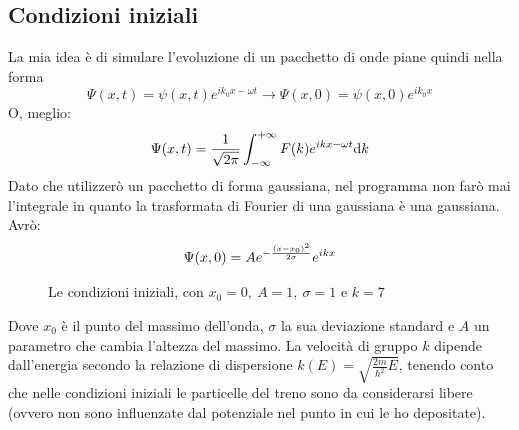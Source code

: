 \subsection{Condizioni iniziali}
La mia idea \`e di simulare l'evoluzione di un pacchetto di onde piane quindi nella forma
\begin{equation}
  \Psi(x,t) = \psi(x,t)e^{ik_0x-\omega t} \to \Psi(x,0) = \psi(x,0)e^{ik_0x}
\end{equation}
O, meglio:
\begin{equation}
  \Psi(x,t) = \frac{1}{\sqrt{2\pi}}\int_{-\infty}^{+\infty} F(k) e^{ikx-\omega t}\mathrm{d} k
\end{equation}
Dato che utilizzer\`o un pacchetto  di forma gaussiana, nel programma non far\`o mai l'integrale in quanto la trasformata di Fourier di una gaussiana \`e una gaussiana.
Avr\`o:
\begin{equation}
  \Psi(x,0) = Ae^{-\frac{\left( x-x_0 \right)^2}{2\sigma}}e^{ikx}
\end{equation}


\begin{figure}[hbt]
  \centering
  \caption{Le condizioni iniziali, con $x_0=0,\ A=1,\ \sigma = 1$ e $k=7$}
\end{figure}
Dove $x_0$ \`e il punto del massimo dell'onda, $\sigma$ la sua deviazione standard e $A$ un parametro che cambia l'altezza del massimo.
La velocit\`a di gruppo $k$ dipende dall'energia secondo la relazione di dispersione $k(E) = \sqrt{\frac{2m}{\hbar^2}E}$, tenendo conto che nelle condizioni iniziali le particelle del treno sono da considerarsi libere (ovvero non sono influenzate dal potenziale nel punto in cui le ho depositate).

